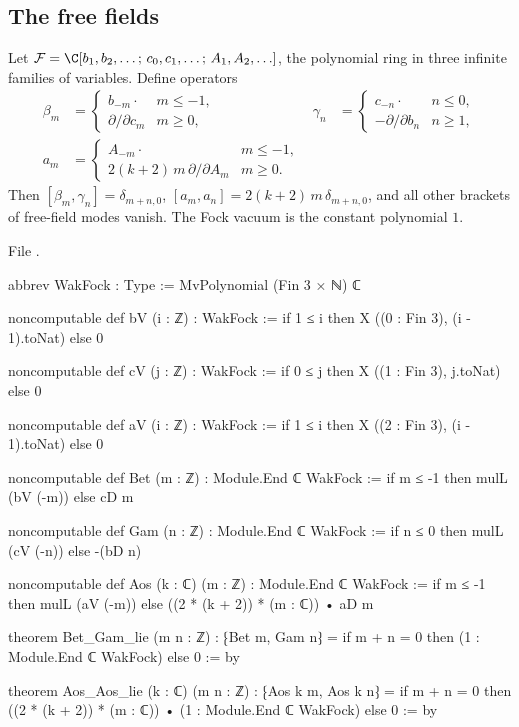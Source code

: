 \subsection{The free fields}

\begin{definition}\label{l08:def:wakfock}
Let $\leightFock = \C[b_1,b_2,\ldots;\,c_0,c_1,\ldots;\,A_1,A_2,\ldots]$, the polynomial ring in three
infinite families of variables. Define operators
\begin{align*}
  \beta_m &= \begin{cases} b_{-m}\cdot & m\le-1,\\ \partial/\partial c_m & m\ge0,\end{cases}
  &\gamma_n &= \begin{cases} c_{-n}\cdot & n\le0,\\ -\partial/\partial b_n & n\ge1,\end{cases}\\
  a_m &= \begin{cases} A_{-m}\cdot & m\le-1,\\ 2(k+2)\,m\,\partial/\partial A_m & m\ge0.\end{cases}
\end{align*}
Then $[\beta_m,\gamma_n] = \delta_{m+n,0}$, $[a_m,a_n] = 2(k+2)\,m\,\delta_{m+n,0}$, and all other brackets of
free-field modes vanish. The Fock vacuum is the constant polynomial $1$.
\end{definition}

\noindent File .
\begin{leancode}
abbrev WakFock : Type := MvPolynomial (Fin 3 × ℕ) ℂ

noncomputable def bV (i : ℤ) : WakFock := if 1 ≤ i then X ((0 : Fin 3), (i - 1).toNat) else 0

noncomputable def cV (j : ℤ) : WakFock := if 0 ≤ j then X ((1 : Fin 3), j.toNat) else 0

noncomputable def aV (i : ℤ) : WakFock := if 1 ≤ i then X ((2 : Fin 3), (i - 1).toNat) else 0

noncomputable def Bet (m : ℤ) : Module.End ℂ WakFock :=
  if m ≤ -1 then mulL (bV (-m)) else cD m

noncomputable def Gam (n : ℤ) : Module.End ℂ WakFock :=
  if n ≤ 0 then mulL (cV (-n)) else -(bD n)

noncomputable def Aos (k : ℂ) (m : ℤ) : Module.End ℂ WakFock :=
  if m ≤ -1 then mulL (aV (-m)) else ((2 * (k + 2)) * (m : ℂ)) • aD m

theorem Bet_Gam_lie (m n : ℤ) :
    ⁅Bet m, Gam n⁆ = if m + n = 0 then (1 : Module.End ℂ WakFock) else 0 := by

theorem Aos_Aos_lie (k : ℂ) (m n : ℤ) :
    ⁅Aos k m, Aos k n⁆
      = if m + n = 0 then ((2 * (k + 2)) * (m : ℂ)) • (1 : Module.End ℂ WakFock) else 0 := by
\end{leancode}

